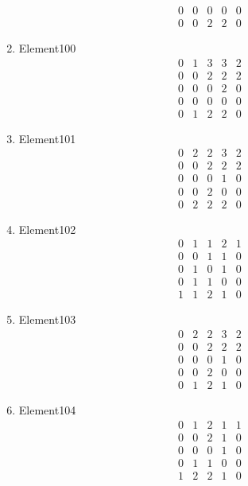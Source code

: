 \documentclass[12pt]{article}
\begin{document}
\begin{multicols}{3}
\begin{enumerate}
\begin{equation*}
\begin{array}{ccccc}
0&0&0&0&0\\
0&0&2&2&0
\end{array}
\end{equation*}
\item Element100
\begin{equation*}
\begin{array}{ccccc}
0&1&3&3&2\\
0&0&2&2&2\\
0&0&0&2&0\\
0&0&0&0&0\\
0&1&2&2&0
\end{array}
\end{equation*}
\item Element101
\begin{equation*}
\begin{array}{ccccc}
0&2&2&3&2\\
0&0&2&2&2\\
0&0&0&1&0\\
0&0&2&0&0\\
0&2&2&2&0
\end{array}
\end{equation*}
\item Element102
\begin{equation*}
\begin{array}{ccccc}
0&1&1&2&1\\
0&0&1&1&0\\
0&1&0&1&0\\
0&1&1&0&0\\
1&1&2&1&0
\end{array}
\end{equation*}
\item Element103
\begin{equation*}
\begin{array}{ccccc}
0&2&2&3&2\\
0&0&2&2&2\\
0&0&0&1&0\\
0&0&2&0&0\\
0&1&2&1&0
\end{array}
\end{equation*}
\item Element104
\begin{equation*}
\begin{array}{ccccc}
0&1&2&1&1\\
0&0&2&1&0\\
0&0&0&1&0\\
0&1&1&0&0\\
1&2&2&1&0
\end{array}

\end{equation*}
\end{enumerate}
\end{multicols}
\end{document}

